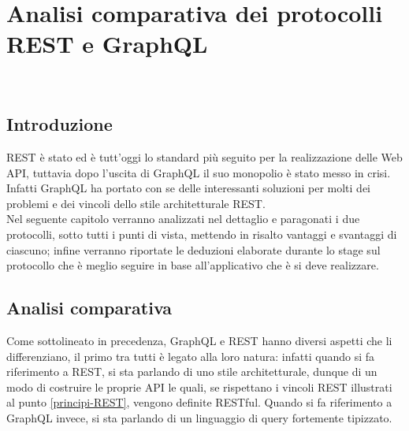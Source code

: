 
\chapter{Analisi comparativa dei protocolli REST e GraphQL}
\label{cap:analisi-comparativa}
\\
\section{Introduzione}
REST è stato ed è tutt'oggi lo standard più seguito per la realizzazione delle Web API, tuttavia dopo l'uscita di GraphQL il suo monopolio è stato messo in crisi. Infatti GraphQL ha portato con se delle interessanti soluzioni per molti dei problemi e dei vincoli dello stile architetturale REST.\\
Nel seguente capitolo verranno analizzati nel dettaglio e paragonati i due protocolli, sotto tutti i punti di vista, mettendo in risalto vantaggi e svantaggi di ciascuno; infine verranno riportate le deduzioni elaborate durante lo stage sul protocollo che è meglio seguire in base all'applicativo che è si deve realizzare.
\section{Analisi comparativa}
Come sottolineato in precedenza, GraphQL e REST hanno diversi aspetti che li differenziano, il primo tra tutti è legato alla loro natura: infatti quando si fa riferimento a REST, si sta parlando di uno stile architetturale, dunque di un modo di costruire le proprie API le quali, se rispettano i vincoli REST illustrati al punto \ref{principi-REST}, vengono definite RESTful. Quando si fa riferimento a GraphQL invece, si sta parlando di un linguaggio di query fortemente tipizzato.
